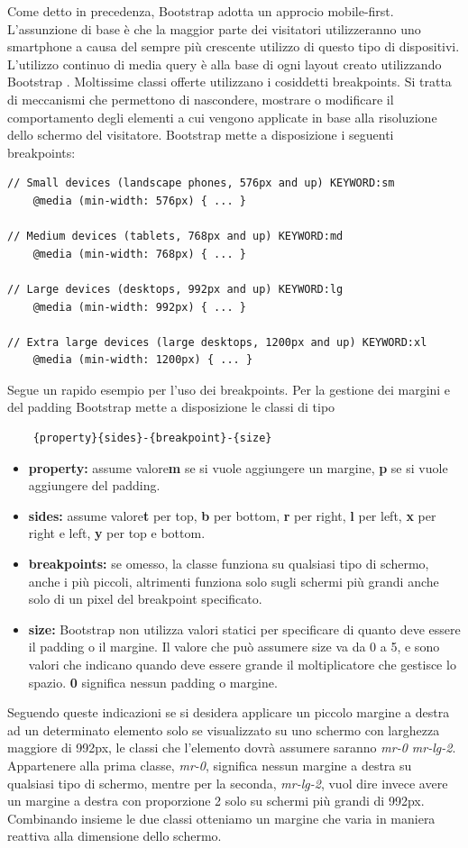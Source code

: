 Come detto in precedenza, Bootstrap adotta un approcio mobile-first. L'assunzione di base è che la maggior parte dei visitatori utilizzeranno uno smartphone a causa del sempre più crescente utilizzo di questo tipo di dispositivi. L'utilizzo continuo di media query è alla base di ogni layout creato utilizzando Bootstrap \cite{bootstrap}. Moltissime classi offerte utilizzano i cosiddetti breakpoints. Si tratta di meccanismi che permettono di nascondere, mostrare o modificare il comportamento degli elementi a cui vengono applicate in base alla risoluzione dello schermo del visitatore.
Bootstrap mette a disposizione i seguenti breakpoints:
\begin{verbatim}
// Small devices (landscape phones, 576px and up) KEYWORD:sm
    @media (min-width: 576px) { ... }
    
// Medium devices (tablets, 768px and up) KEYWORD:md
    @media (min-width: 768px) { ... }
    
// Large devices (desktops, 992px and up) KEYWORD:lg
    @media (min-width: 992px) { ... }
    
// Extra large devices (large desktops, 1200px and up) KEYWORD:xl
    @media (min-width: 1200px) { ... } 
\end{verbatim}
Segue un rapido esempio per l'uso dei breakpoints. Per la gestione dei margini e del padding Bootstrap mette a disposizione le classi di tipo 
\begin{verbatim}
    {property}{sides}-{breakpoint}-{size}
\end{verbatim}
\begin{itemize}
    \item \textbf{property:} assume valore\textbf{m} se si vuole aggiungere un margine, \textbf{p} se si vuole aggiungere del padding.
    \item \textbf{sides:} assume valore\textbf{t} per top, \textbf{b} per bottom, \textbf{r} per right, \textbf{l} per left, \textbf{x} per right e left, \textbf{y} per top e bottom.
    \item \textbf{breakpoints:} se omesso, la classe funziona su qualsiasi tipo di schermo, anche i più piccoli, altrimenti funziona solo sugli schermi più grandi anche solo di un pixel del breakpoint specificato.
    \item \textbf{size:} Bootstrap non utilizza valori statici per specificare di quanto deve essere il padding o il margine. Il valore che può assumere size va da 0 a 5, e sono valori che indicano quando deve essere grande il moltiplicatore che gestisce lo spazio. \textbf{0} significa nessun padding o margine.
\end{itemize}
Seguendo queste indicazioni se si desidera applicare un piccolo margine a destra ad un determinato elemento solo se visualizzato su uno schermo con larghezza maggiore di 992px, le classi che l'elemento dovrà assumere saranno \emph{mr-0 mr-lg-2}. Appartenere alla prima classe, \emph{mr-0}, significa nessun margine a destra su qualsiasi tipo di schermo, mentre per la seconda, \emph{mr-lg-2}, vuol dire invece avere un margine a destra con proporzione 2 solo su schermi più grandi di 992px. Combinando insieme le due classi otteniamo un margine che varia in maniera reattiva alla dimensione dello schermo\cite{bootstrapDoc}.

